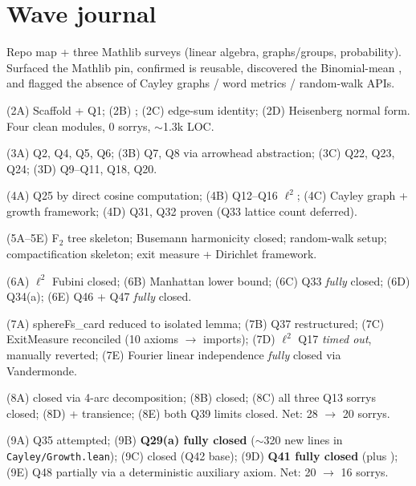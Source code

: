 \documentclass[11pt,a4paper]{article}
\newcommand{\lmod}[1]{\texttt{\small #1}}
\theoremstyle{plain}
\theoremstyle{definition}
\begin{document}
\section{Wave journal}\label{sec:wave-journal}

Repo map + three Mathlib surveys (linear algebra, graphs/groups,
probability). Surfaced the Mathlib pin, confirmed
 is reusable, discovered the Binomial-mean
, and flagged the absence of Cayley graphs / word
metrics / random-walk APIs.

(2A) Scaffold + Q1; (2B) ; (2C) edge-sum
identity; (2D) Heisenberg normal form. Four clean modules, 0 sorrys,
$\sim$1.3k LOC.

(3A) Q2, Q4, Q5, Q6; (3B) Q7, Q8 via arrowhead abstraction; (3C) Q22,
Q23, Q24; (3D) Q9--Q11, Q18, Q20.

(4A) Q25 by direct cosine computation; (4B) Q12--Q16 $\ell^2$;
(4C) Cayley graph + growth framework; (4D) Q31, Q32 proven (Q33
lattice count deferred).

(5A--5E) F$_2$ tree skeleton; Busemann harmonicity closed; random-walk
setup; compactification skeleton; exit measure + Dirichlet
framework.

(6A) $\ell^2$ Fubini closed; (6B) Manhattan lower bound; (6C) Q33
\emph{fully} closed; (6D) Q34(a); (6E) Q46 + Q47 \emph{fully} closed.

(7A) sphereFs\_card reduced to isolated lemma; (7B) Q37 restructured;
(7C) ExitMeasure reconciled (10 axioms $\to$ imports);
(7D) $\ell^2$ Q17 \emph{timed out}, manually reverted;
(7E) Fourier linear independence \emph{fully} closed via Vandermonde.

(8A)  closed via 4-arc decomposition;
(8B)  closed;
(8C) all three Q13 sorrys closed; (8D)  +
transience; (8E) both Q39 limits closed.
Net: 28 $\to$ 20 sorrys.

(9A) Q35 attempted; (9B) \textbf{Q29(a) fully closed}
($\sim$320 new lines in \lmod{Cayley/Growth.lean});
(9C)  closed (Q42 base);
(9D) \textbf{Q41 fully closed} (plus );
(9E) Q48 partially via a deterministic auxiliary axiom.
Net: 20 $\to$ 16 sorrys.
\end{document}
